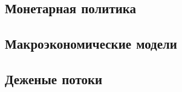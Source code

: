 

\subsection{Монетарная политика}


\subsection{Макроэкономические модели}


\subsection{Деженые потоки}

